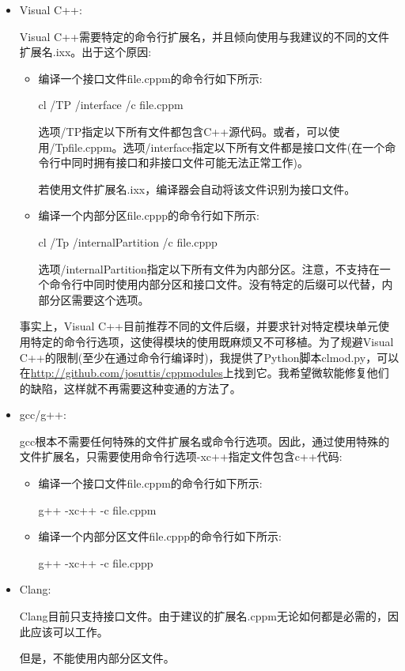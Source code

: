 \begin{itemize}
\item 
Visual C++:

Visual C++需要特定的命令行扩展名，并且倾向使用与我建议的不同的文件扩展名.ixx。出于这个原因:

\begin{itemize}
\item 
编译一个接口文件file.cppm的命令行如下所示:

\begin{shell}
cl /TP /interface /c file.cppm
\end{shell}

选项/TP指定以下所有文件都包含C++源代码。或者，可以使用/Tpfile.cppm。选项/interface指定以下所有文件都是接口文件(在一个命令行中同时拥有接口和非接口文件可能无法正常工作)。

若使用文件扩展名.ixx，编译器会自动将该文件识别为接口文件。

\item 
编译一个内部分区file.cppp的命令行如下所示:

\begin{shell}
cl /Tp /internalPartition /c file.cppp
\end{shell}

选项/internalPartition指定以下所有文件为内部分区。注意，不支持在一个命令行中同时使用内部分区和接口文件。没有特定的后缀可以代替，内部分区需要这个选项。
\end{itemize}

事实上，Visual C++目前推荐不同的文件后缀，并要求针对特定模块单元使用特定的命令行选项，这使得模块的使用既麻烦又不可移植。为了规避Visual C++的限制(至少在通过命令行编译时)，我提供了Python脚本clmod.py，可以在\url{http://github.com/josuttis/cppmodules}上找到它。我希望微软能修复他们的缺陷，这样就不再需要这种变通的方法了。

\item 
gcc/g++:

gcc根本不需要任何特殊的文件扩展名或命令行选项。因此，通过使用特殊的文件扩展名，只需要使用命令行选项-xc++指定文件包含c++代码:

\begin{itemize}
\item 
编译一个接口文件file.cppm的命令行如下所示:

\begin{shell}
g++ -xc++ -c file.cppm
\end{shell}

\item
编译一个内部分区文件file.cppp的命令行如下所示:

\begin{shell}
g++ -xc++ -c file.cppp
\end{shell}
\end{itemize}

\item 
Clang:

Clang目前只支持接口文件。由于建议的扩展名.cppm无论如何都是必需的，因此应该可以工作。

但是，不能使用内部分区文件。
\end{itemize}

